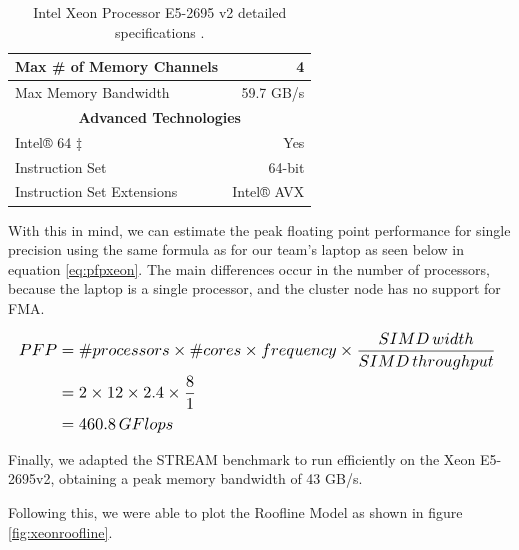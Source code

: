 \documentclass[twoside,twocolumn]{article}
\begin{document}
\begin{table}[h]
{\begin{tabular}{|l|r|}
Max \# of Memory Channels  & 4                                                   \\ \hline
Max Memory Bandwidth       & 59.7 GB/s                                           \\ \hline
\multicolumn{2}{|c|}{\textbf{Advanced Technologies}}                             \\ \hline
Intel® 64 ‡                & Yes                                                 \\ \hline
Instruction Set            & 64-bit                                              \\ \hline
Instruction Set Extensions & Intel® AVX                                          \\ \hline
\end{tabular}%
}
\caption{Intel Xeon Processor E5-2695 v2 detailed specifications \cite{cpuworld_xeon} \cite{intel_xeon}.}
\label{tab:xeonspecs}
\end{table}

With this in mind, we can estimate the peak floating point performance for single precision using the same formula as for our team's laptop as seen below in equation \ref{eq:pfpxeon}. The main differences occur in the number of processors, because the laptop is a single processor, and the cluster node has no support for FMA.

\begin{equation} \label{eq:pfpxeon}
\resizebox{\columnwidth}{!}{%
$\begin{aligned}
PFP & = \#processors \times \#cores \times frequency \times \frac{SIMD \thinspace width}{SIMD \thinspace throughput} \\
    & = 2 \times 12 \times 2.4 \times \frac{8}{1} \\
    & = 460.8 \thinspace GFlops
\end{aligned}$
}
\end{equation}

Finally, we adapted the STREAM benchmark to run efficiently on the Xeon E5-2695v2, obtaining a peak memory bandwidth of 43 GB/s.

Following this, we were able to plot the Roofline Model as shown in figure \ref{fig:xeonroofline}.
\end{document}
